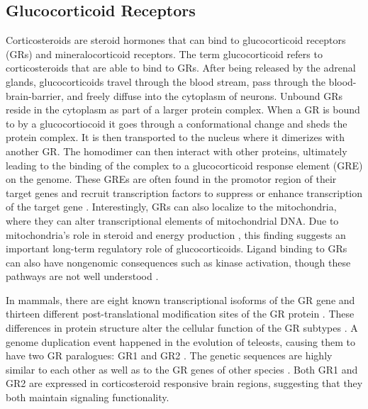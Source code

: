 \documentclass[12pt,twoside]{reedthesis}
\begin{document}
\subsection{Glucocorticoid Receptors}
Corticosteroids are steroid hormones that can bind to glucocorticoid receptors (GRs)
and mineralocorticoid receptors. The term glucocorticoid refers to
corticosteroids that are able to bind to GRs. After being
released by the adrenal glands, glucocorticoids travel through the blood stream,
pass through the blood-brain-barrier, and freely diffuse into the cytoplasm of
neurons. Unbound GRs reside in the cytoplasm as part of a larger protein
complex. When a GR is bound to by a glucocortiocoid it goes through a
conformational change and sheds the protein complex. It is then
transported to the nucleus where it dimerizes with another GR. The homodimer
can then interact with other proteins, ultimately leading to the binding of the
complex to a glucocorticoid response element (GRE) on the genome. These GREs are often
found in the promotor region of their target genes and recruit
transcription factors to suppress or enhance transcription of the target gene
\citep{2017Nrid, herman_limbic_2005}. Interestingly, GRs can also localize to the mitochondria,
where they can alter transcriptional elements of mitochondrial DNA. Due to
mitochondria's role in steroid and energy production \citep{lapp_stress_2019}, this finding
suggests an important long-term regulatory role of glucocorticoids. Ligand binding to GRs can also have nongenomic consequences such as kinase
activation, though these pathways are not well understood \citep{samarasinghe_nongenomic_2011}.

In mammals, there are eight known transcriptional isoforms of the GR gene \citep{saif_expression_2015} and
thirteen different post-translational modification sites of the GR protein \citep{oakley_biology_2013}. These differences in protein structure alter the
cellular function of the GR subtypes \citep{lu_selective_2007}. A genome duplication event happened in the evolution of teleosts, causing them
to have two GR paralogues: GR1 and GR2 \citep{Glasauer2014}. The genetic sequences are
highly similar to each other as well as to the GR genes of other species \citep{greenwood_multiple_2003}.
Both GR1 and GR2 are expressed in corticosteroid
responsive brain regions,
suggesting that they both maintain signaling functionality.
\end{document}
